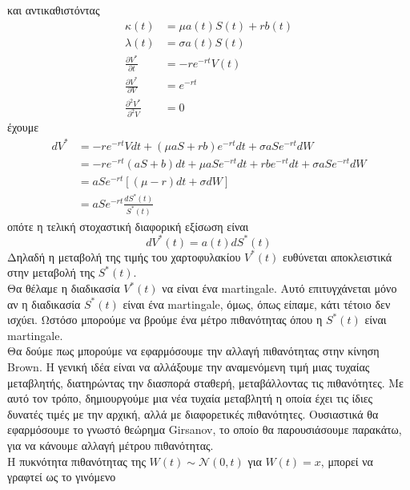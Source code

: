 \documentclass[12pt,a4paper,twoside,openany]{book}
\begin{document}
 	και αντικαθιστόντας
 	\begin{align*}
 		\kappa(t) &= \mu a(t)S(t) + rb(t) \\
 		\lambda(t) &= \sigma a(t)S(t) \\
 		\frac{\partial V^*}{\partial t} &= -re^{-rt}V(t) \\
 		\frac{\partial V^*}{\partial V} &= e^{-rt} \\ 
 		\frac{\partial^2 V^*}{\partial^2 V}	&= 0	
 	\end{align*}
 	έχουμε
 	\begin{align*}
 		dV^* &= -re^{-rt}Vdt + (\mu aS+rb)e^{-rt}dt + \sigma aSe^{-rt}dW \\
 			&= -re^{-rt}(aS+b)dt + \mu aSe^{-rt}dt +rbe^{-rt}dt + \sigma aSe^{-rt}dW \\
 			&= aSe^{-rt}\left[(\mu-r)dt+\sigma dW\right]  \\
 			&= aSe^{-rt}\frac{dS^*(t)}{S^*(t)}	
 	\end{align*}
 	οπότε η τελική στοχαστική διαφορική εξίσωση είναι
 	\[dV^*(t) = a(t)dS^*(t) \label{V*SDE}\tag{3.1.3}\]
 	Δηλαδή η μεταβολή της τιμής του χαρτοφυλακίου $V^*(t)$ ευθύνεται αποκλειστικά στην μεταβολή της $S^*(t)$.
 	\vspace{2.5mm}\\
 	Θα θέλαμε η διαδικασία $V^*(t)$ να είναι ένα martingale. Αυτό επιτυγχάνεται μόνο αν η διαδικασία $S^*(t)$ είναι ένα martingale, όμως, όπως είπαμε, κάτι τέτοιο δεν ισχύει. Ωστόσο μπορούμε να βρούμε ένα μέτρο πιθανότητας όπου η $S^*(t)$ είναι martingale.
 	\vspace{2.5mm}\\
 	Θα δούμε πως μπορούμε να εφαρμόσουμε την αλλαγή πιθανότητας στην κίνηση Brown. Η γενική ιδέα είναι να αλλάξουμε την αναμενόμενη τιμή μιας τυχαίας μεταβλητής, διατηρώντας την διασπορά σταθερή, μεταβάλλοντας τις πιθανότητες. Με αυτό τον τρόπο, δημιουργούμε μια νέα τυχαία μεταβλητή η οποία έχει τις ίδιες δυνατές τιμές με την αρχική, αλλά με διαφορετικές πιθανότητες. Ουσιαστικά θα εφαρμόσουμε το γνωστό θεώρημα Girsanov, το οποίο θα παρουσιάσουμε παρακάτω, για να κάνουμε αλλαγή μέτρου πιθανότητας. 
 	\vspace{2.5mm}\\
 	Η πυκνότητα πιθανότητας της $W(t)\sim\mathcal{N}(0,t)$ για $W(t)=x$, μπορεί να γραφτεί ως το γινόμενο
\end{document}
